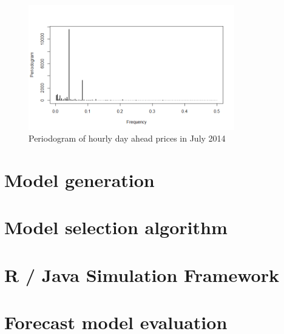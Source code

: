 \begin{figure}[htbp]
	\centering
		\includegraphics[width=0.8\textwidth]{figures/forecasting/periodogram_July_2014.png}
	\caption{Periodogram of hourly day ahead prices in July 2014}
	\label{fig:periodogram_July_2014}
\end{figure}


\section{Model generation}





\section{Model selection algorithm}



\section{R / Java Simulation Framework}



\section{Forecast model evaluation}











